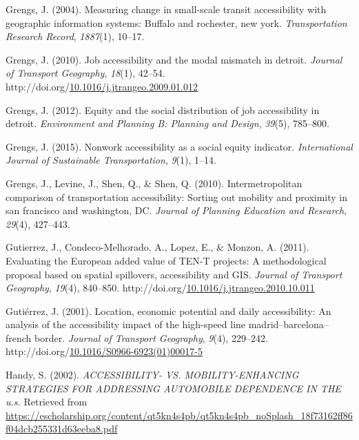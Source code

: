 \documentclass[
11pt, %
oneside, %
english, %
singlespacing, %
]{macthesis} %
\newlength{\cslhangindent}
\newenvironment{CSLReferences}[2] %
{\begin{list}{}{%
	\setlength{\itemindent}{0pt}
	\setlength{\leftmargin}{0pt}
	\setlength{\parsep}{0pt}
	\ifodd #1
	\setlength{\leftmargin}{\cslhangindent}
	\setlength{\itemindent}{-1\cslhangindent}
	\fi
	\setlength{\itemsep}{#2\baselineskip}}}
{\end{list}}
\begin{document}
\begin{CSLReferences}{1}{0}
Grengs, J. (2004). Measuring change in small-scale transit accessibility with geographic information systems: Buffalo and rochester, new york. \emph{Transportation Research Record}, \emph{1887}(1), 10--17.

Grengs, J. (2010). Job accessibility and the modal mismatch in detroit. \emph{Journal of Transport Geography}, \emph{18}(1), 42--54. http://doi.org/\href{https://doi.org/10.1016/j.jtrangeo.2009.01.012}{10.1016/j.jtrangeo.2009.01.012}

Grengs, J. (2012). Equity and the social distribution of job accessibility in detroit. \emph{Environment and Planning B: Planning and Design}, \emph{39}(5), 785--800.

Grengs, J. (2015). Nonwork accessibility as a social equity indicator. \emph{International Journal of Sustainable Transportation}, \emph{9}(1), 1--14.

Grengs, J., Levine, J., Shen, Q., \& Shen, Q. (2010). Intermetropolitan comparison of transportation accessibility: Sorting out mobility and proximity in san francisco and washington, DC. \emph{Journal of Planning Education and Research}, \emph{29}(4), 427--443.

Gutierrez, J., Condeco-Melhorado, A., Lopez, E., \& Monzon, A. (2011). Evaluating the {European} added value of {TEN}-{T} projects: A methodological proposal based on spatial spillovers, accessibility and {GIS}. \emph{Journal of Transport Geography}, \emph{19}(4), 840--850. http://doi.org/\href{https://doi.org/10.1016/j.jtrangeo.2010.10.011}{10.1016/j.jtrangeo.2010.10.011}

Gutiérrez, J. (2001). Location, economic potential and daily accessibility: An analysis of the accessibility impact of the high-speed line madrid--barcelona--french border. \emph{Journal of Transport Geography}, \emph{9}(4), 229--242. http://doi.org/\href{https://doi.org/10.1016/S0966-6923(01)00017-5}{10.1016/S0966-6923(01)00017-5}

Handy, S. (2002). \emph{{ACCESSIBILITY}- {VS}. {MOBILITY}-{ENHANCING} {STRATEGIES} {FOR} {ADDRESSING} {AUTOMOBILE} {DEPENDENCE} {IN} {THE} u.s.} Retrieved from \url{https://escholarship.org/content/qt5kn4s4pb/qt5kn4s4pb_noSplash_18f73162ff86f04dcb255331d63eeba8.pdf}


\end{CSLReferences}
\end{document}
